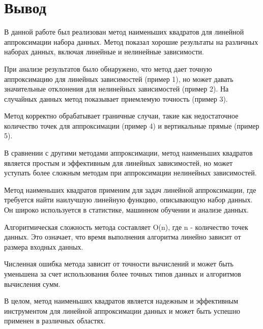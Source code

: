 \section{Вывод}

В данной работе был реализован метод наименьших квадратов для линейной аппроксимации набора данных. Метод показал хорошие результаты на различных наборах данных, включая линейные и нелинейные зависимости.

При анализе результатов было обнаружено, что метод дает точную аппроксимацию для линейных зависимостей (пример 1), но может давать значительные отклонения для нелинейных зависимостей (пример 2). На случайных данных метод показывает приемлемую точность (пример 3).

Метод корректно обрабатывает граничные случаи, такие как недостаточное количество точек для аппроксимации (пример 4) и вертикальные прямые (пример 5).

В сравнении с другими методами аппроксимации, метод наименьших квадратов является простым и эффективным для линейных зависимостей, но может уступать более сложным методам при аппроксимации нелинейных зависимостей.

Метод наименьших квадратов применим для задач линейной аппроксимации, где требуется найти наилучшую линейную функцию, описывающую набор данных. Он широко используется в статистике, машинном обучении и анализе данных.

Алгоритмическая сложность метода составляет O(n), где n - количество точек данных. Это означает, что время выполнения алгоритма линейно зависит от размера входных данных.

Численная ошибка метода зависит от точности вычислений и может быть уменьшена за счет использования более точных типов данных и алгоритмов вычисления сумм.

В целом, метод наименьших квадратов является надежным и эффективным инструментом для линейной аппроксимации данных и может быть успешно применен в различных областях.